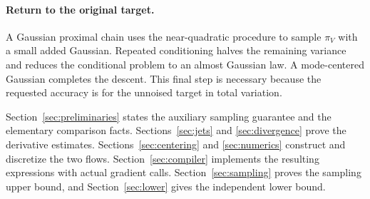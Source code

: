 \paragraph{Return to the original target.}
A Gaussian proximal chain uses the near-quadratic
procedure to sample \(\pi_V\) with a small added
Gaussian. Repeated conditioning halves the
remaining variance and reduces the conditional
problem to an almost Gaussian law. A mode-centered
Gaussian completes the descent. This final
step is necessary because the requested accuracy
is for the unnoised target in total variation.

Section~\ref{sec:preliminaries} states the auxiliary
sampling guarantee and the elementary comparison
facts. Sections~\ref{sec:jets} and \ref{sec:divergence}
prove the derivative estimates.
Sections~\ref{sec:centering} and \ref{sec:numerics}
construct and discretize the two flows.
Section~\ref{sec:compiler} implements the resulting
expressions with actual gradient calls.
Section~\ref{sec:sampling} proves the sampling
upper bound, and Section~\ref{sec:lower} gives
the independent lower bound.
